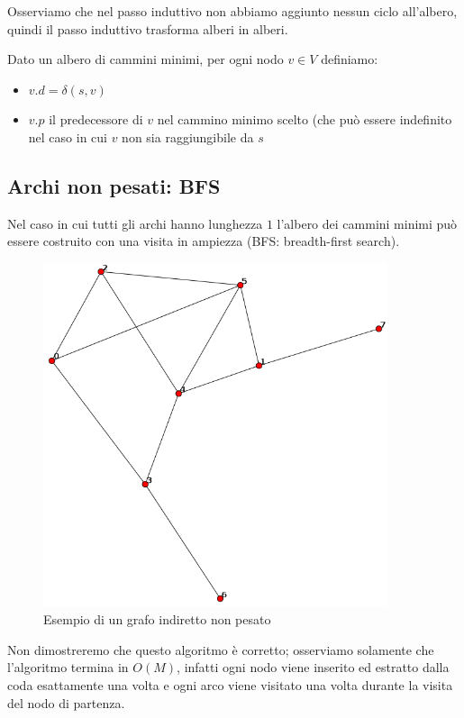 \documentclass[a4paper,10pt]{amsbook}
\theoremstyle{plain}
\theoremstyle{definition}
\theoremstyle{remark}
\begin{document}
Osserviamo che nel passo induttivo non abbiamo aggiunto nessun ciclo
all'albero, quindi il passo induttivo trasforma alberi in alberi.

Dato un albero di cammini minimi, per ogni nodo $v\in V$ definiamo:
\begin{itemize}
\item $v.d = \delta(s,v)$
\item $v.p$ il predecessore di $v$ nel cammino minimo scelto (che può
  essere indefinito nel caso in cui $v$ non sia raggiungibile da $s$
\end{itemize}

\subsection{Archi non pesati: BFS}

Nel caso in cui tutti gli archi hanno lunghezza $1$ l'albero dei
cammini minimi può essere costruito con una visita in ampiezza (BFS:
breadth-first search).

\begin{figure}[h]
  \centering
  \includegraphics[width=0.9\textwidth]{preBFS}
  \caption{Esempio di un grafo indiretto non pesato}
  \label{fig:preBFS}
\end{figure}


\begin{figure}[H]
  \begin{algorithmic}
      
    \EndFor
            
    \EndIf
    \EndFor
    \EndWhile
  \end{algorithmic}
\label{fig:BFScode}
\end{figure}
Non dimostreremo che questo algoritmo è corretto; osserviamo solamente
che l'algoritmo termina in $O (M)$, infatti ogni nodo viene
inserito ed estratto dalla coda esattamente una volta e ogni arco
viene visitato una volta durante la visita del nodo di partenza.
\end{document}
